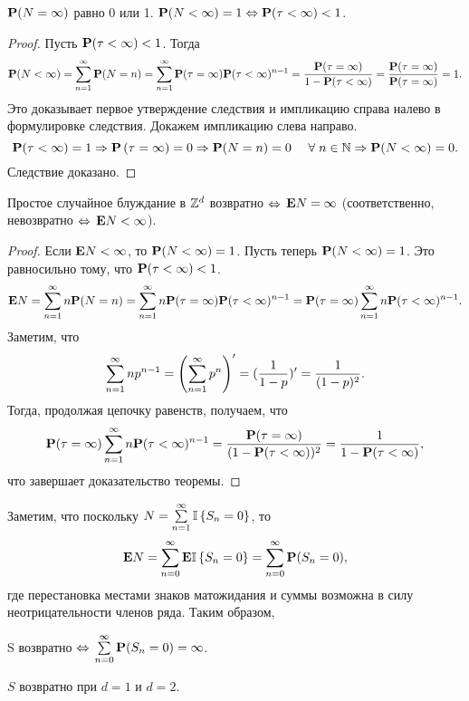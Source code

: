 \begin{imp}
	$\mathbf{P}(N = \infty)$ равно 0 или 1.
	$\mathbf{P}(N < \infty) = 1 \Leftrightarrow \mathbf{P}(\tau < \infty) < 1$.
\end{imp}

\begin{proof}
	Пусть $\mathbf{P}(\tau < \infty) < 1$.
	Тогда
	$$
		\mathbf{P}(N < \infty) = \sum\limits_{n=1}^{\infty} \mathbf{P}(N = n) = \sum\limits_{n=1}^{\infty} \mathbf{P}(\tau = \infty) \mathbf{P}(\tau < \infty)^{n-1}
		= \frac{\mathbf{P}(\tau = \infty)}{1 - \mathbf{P}(\tau < \infty)} = \frac{\mathbf{P}(\tau = \infty)}{\mathbf{P}(\tau = \infty)} = 1.
	$$
	Это доказывает первое утверждение следствия и импликацию справа налево в формулировке следствия.
	Докажем импликацию слева направо.
	$$
		\mathbf{P}(\tau < \infty) = 1 \Rightarrow \mathbf{P} \left(\tau = \infty \right) = 0 \Rightarrow \mathbf{P}(N = n) = 0
			\quad ~\forall\; n \in \mathbb{N} \Rightarrow \mathbf{P}(N < \infty) = 0.
	$$
	Следствие доказано.
\end{proof}

\begin{theorem}
	Простое случайное блуждание в $\mathbb{Z}^d$ возвратно $\Leftrightarrow$ $\mathbf{E} N = \infty$
	(соответственно, невозвратно $\Leftrightarrow$ $\mathbf{E} N < \infty$).
\end{theorem}

\begin{proof}
	Если $\mathbf{E} N < \infty$, то $\mathbf{P}(N<\infty) = 1$.
	Пусть теперь $\mathbf{P}(N<\infty) = 1$.
	Это равносильно тому, что $\mathbf{P}(\tau < \infty) < 1$.
	$$
		\mathbf{E} N = \sum\limits_{n=1}^{\infty} n\mathbf{P}(N=n)
	=	\sum\limits_{n=1}^{\infty} n\mathbf{P}(\tau = \infty)\mathbf{P}(\tau < \infty)^{n-1}
	=	\mathbf{P}(\tau = \infty)\sum\limits_{n=1}^{\infty} n\mathbf{P}(\tau < \infty)^{n-1}.
	$$
	Заметим, что
	$$
		\sum\limits_{n=1}^{\infty} np^{n-1} = \left(\sum\limits_{n=1}^{\infty} p^n\right)^{\prime} = (\frac1{1-p})^{\prime} = \frac1{(1-p)^2}.
	$$
	Тогда, продолжая цепочку равенств, получаем, что
	$$
		\mathbf{P}(\tau = \infty)\sum\limits_{n=1}^{\infty} n\mathbf{P}(\tau < \infty)^{n-1} =
		\frac{\mathbf{P}(\tau = \infty)}{(1 - \mathbf{P}(\tau < \infty))^2} = \frac1{1 - \mathbf{P}(\tau < \infty)},
	$$
	что завершает доказательство теоремы.
\end{proof}

\begin{note}
	Заметим, что поскольку $N = \sum\limits_{n=1}^{\infty} \mathbb{I} \left\{S_n = 0\right\}$, то
	$$
		\mathbf{E} N = \sum\limits_{n=0}^{\infty} \mathbf{E} \mathbb{I} \left\{S_n = 0\right\} = \sum\limits_{n=0}^{\infty} \mathbf{P}(S_n = 0),
	$$
	где перестановка местами знаков матожидания и суммы возможна в силу неотрицательности членов ряда.
	Таким образом,
	\begin{center}
		S возвратно $\Leftrightarrow$ $\sum\limits_{n=0}^{\infty} \mathbf{P}(S_n = 0) = \infty$.
	\end{center}
\end{note}

\begin{imp}
	$S$ возвратно при $d = 1$ и $d = 2$.
\end{imp}

